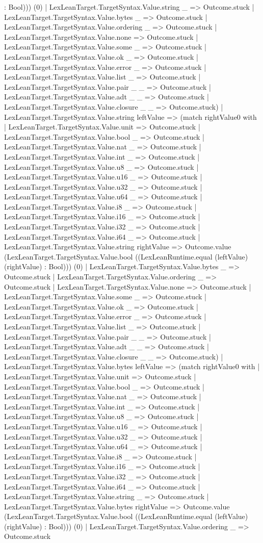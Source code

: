\documentclass[11pt]{article}
\begin{document}
: Bool))) (0) | LexLeanTarget.TargetSyntax.Value.string \_ => Outcome.stuck | LexLeanTarget.TargetSyntax.Value.bytes \_ => Outcome.stuck | LexLeanTarget.TargetSyntax.Value.ordering \_ => Outcome.stuck | LexLeanTarget.TargetSyntax.Value.none => Outcome.stuck | LexLeanTarget.TargetSyntax.Value.some \_ => Outcome.stuck | LexLeanTarget.TargetSyntax.Value.ok \_ => Outcome.stuck | LexLeanTarget.TargetSyntax.Value.error \_ => Outcome.stuck | LexLeanTarget.TargetSyntax.Value.list \_ => Outcome.stuck | LexLeanTarget.TargetSyntax.Value.pair \_ \_ => Outcome.stuck | LexLeanTarget.TargetSyntax.Value.adt \_ \_ => Outcome.stuck | LexLeanTarget.TargetSyntax.Value.closure \_ \_ => Outcome.stuck) | LexLeanTarget.TargetSyntax.Value.string leftValue => (match rightValue0 with | LexLeanTarget.TargetSyntax.Value.unit => Outcome.stuck | LexLeanTarget.TargetSyntax.Value.bool \_ => Outcome.stuck | LexLeanTarget.TargetSyntax.Value.nat \_ => Outcome.stuck | LexLeanTarget.TargetSyntax.Value.int \_ => Outcome.stuck | LexLeanTarget.TargetSyntax.Value.u8 \_ => Outcome.stuck | LexLeanTarget.TargetSyntax.Value.u16 \_ => Outcome.stuck | LexLeanTarget.TargetSyntax.Value.u32 \_ => Outcome.stuck | LexLeanTarget.TargetSyntax.Value.u64 \_ => Outcome.stuck | LexLeanTarget.TargetSyntax.Value.i8 \_ => Outcome.stuck | LexLeanTarget.TargetSyntax.Value.i16 \_ => Outcome.stuck | LexLeanTarget.TargetSyntax.Value.i32 \_ => Outcome.stuck | LexLeanTarget.TargetSyntax.Value.i64 \_ => Outcome.stuck | LexLeanTarget.TargetSyntax.Value.string rightValue => Outcome.value (LexLeanTarget.TargetSyntax.Value.bool ((LexLeanRuntime.equal (leftValue) (rightValue) : Bool))) (0) | LexLeanTarget.TargetSyntax.Value.bytes \_ => Outcome.stuck | LexLeanTarget.TargetSyntax.Value.ordering \_ => Outcome.stuck | LexLeanTarget.TargetSyntax.Value.none => Outcome.stuck | LexLeanTarget.TargetSyntax.Value.some \_ => Outcome.stuck | LexLeanTarget.TargetSyntax.Value.ok \_ => Outcome.stuck | LexLeanTarget.TargetSyntax.Value.error \_ => Outcome.stuck | LexLeanTarget.TargetSyntax.Value.list \_ => Outcome.stuck | LexLeanTarget.TargetSyntax.Value.pair \_ \_ => Outcome.stuck | LexLeanTarget.TargetSyntax.Value.adt \_ \_ => Outcome.stuck | LexLeanTarget.TargetSyntax.Value.closure \_ \_ => Outcome.stuck) | LexLeanTarget.TargetSyntax.Value.bytes leftValue => (match rightValue0 with | LexLeanTarget.TargetSyntax.Value.unit => Outcome.stuck | LexLeanTarget.TargetSyntax.Value.bool \_ => Outcome.stuck | LexLeanTarget.TargetSyntax.Value.nat \_ => Outcome.stuck | LexLeanTarget.TargetSyntax.Value.int \_ => Outcome.stuck | LexLeanTarget.TargetSyntax.Value.u8 \_ => Outcome.stuck | LexLeanTarget.TargetSyntax.Value.u16 \_ => Outcome.stuck | LexLeanTarget.TargetSyntax.Value.u32 \_ => Outcome.stuck | LexLeanTarget.TargetSyntax.Value.u64 \_ => Outcome.stuck | LexLeanTarget.TargetSyntax.Value.i8 \_ => Outcome.stuck | LexLeanTarget.TargetSyntax.Value.i16 \_ => Outcome.stuck | LexLeanTarget.TargetSyntax.Value.i32 \_ => Outcome.stuck | LexLeanTarget.TargetSyntax.Value.i64 \_ => Outcome.stuck | LexLeanTarget.TargetSyntax.Value.string \_ => Outcome.stuck | LexLeanTarget.TargetSyntax.Value.bytes rightValue => Outcome.value (LexLeanTarget.TargetSyntax.Value.bool ((LexLeanRuntime.equal (leftValue) (rightValue) : Bool))) (0) | LexLeanTarget.TargetSyntax.Value.ordering \_ => Outcome.stuck 
\end{document}

